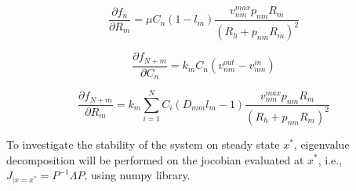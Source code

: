 \documentclass[12pt]{article}
\begin{document}
\begin{equation}
    \frac{\partial{f_n}}{\partial{R_m}} = \mu C_n (1-l_m) \frac{v^{max}_{nm} p_{nm} R_m}{(R_h + p_{nm}R_m)^2}
\end{equation}

\begin{equation}
    \frac{\partial{f_{N+m}}}{\partial{C_n}} = k_m C_n (v^{out}_{nm} - v^{in}_{nm})
\end{equation}

\begin{equation}
    \frac{\partial{f_{N+m}}}{\partial{R_m}} = k_m \displaystyle \sum^N_{i=1} C_i (D_{mm}l_m - 1) \frac{v^{max}_{nm} p_{nm} R_m}{(R_h + p_{nm}R_m)^2}
\end{equation}

To investigate the stability of the system on steady state $x^*$, eigenvalue decomposition will be performed on the jocobian evaluated at $x^*$, i.e., $J_{|x=x^*} = P^{-1} \Lambda P $, using numpy library.
\end{document}
